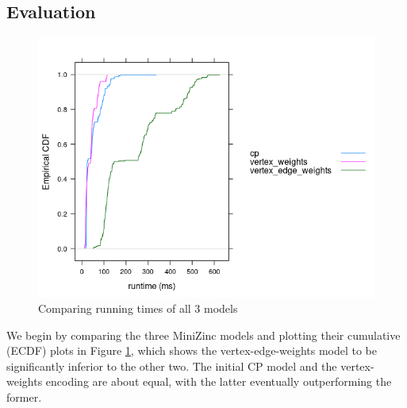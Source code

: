 \documentclass{article}
\theoremstyle{definition}
\begin{document}
\subsection{Evaluation}
\begin{figure}
  \includegraphics[scale=0.75]{comparison.png}
  \caption{Comparing running times of all 3 models}
  \label{fig:comparison}
\end{figure}
We begin by comparing the three MiniZinc models and plotting their cumulative (ECDF) plots in Figure \ref{fig:comparison}, which shows the vertex-edge-weights model to be significantly inferior to the other two. The initial CP model and the vertex-weights encoding are about equal, with the latter eventually outperforming the former.
\end{document}
